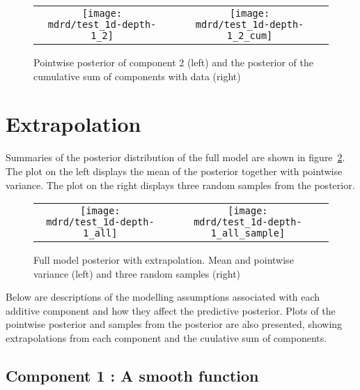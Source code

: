 \documentclass{article} %
\begin{document}
\begin{figure}[H]
\newcommand{\wmgd}{0.5\columnwidth}
\newcommand{\hmgd}{3.0cm}
\newcommand{\mdrd}{test_1d-depth-1}
\newcommand{\mbm}{\hspace{-0.3cm}}
\begin{tabular}{cc}
\mbm \texttt{[image: \\mdrd/test\_1d-depth-1\_2]} & \texttt{[image: \\mdrd/test\_1d-depth-1\_2\_cum]}
\end{tabular}
\caption{Pointwise posterior of component 2 (left) and the posterior of the cumulative sum of components with data (right)}
\label{fig:comp2}
\end{figure}

\section{Extrapolation}
\label{sec:extrap}

Summaries of the posterior distribution of the full model are shown in figure~\ref{fig:extrap}.
The plot on the left displays the mean of the posterior together with pointwise variance.
The plot on the right displays three random samples from the posterior.

\begin{figure}[H]
\newcommand{\wmgd}{0.5\columnwidth}
\newcommand{\hmgd}{3.0cm}
\newcommand{\mdrd}{test_1d-depth-1}
\newcommand{\mbm}{\hspace{-0.3cm}}
\begin{tabular}{cc}
\mbm \texttt{[image: \\mdrd/test\_1d-depth-1\_all]} & \texttt{[image: \\mdrd/test\_1d-depth-1\_all\_sample]}
\end{tabular}
\caption{Full model posterior with extrapolation. Mean and pointwise variance (left) and three random samples (right)}
\label{fig:extrap}
\end{figure}

Below are descriptions of the modelling assumptions associated with each additive component and how they affect the predictive posterior.
Plots of the pointwise posterior and samples from the posterior are also presented, showing extrapolations from each component and the cuulative sum of components.

\subsection{Component 1 : A smooth function}


\end{document}
